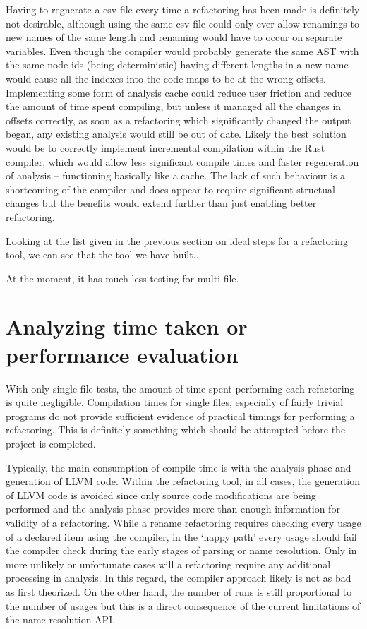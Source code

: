 Having to regnerate a csv file every time a refactoring has been made is definitely not desirable, although using the same csv file could only ever allow renamings to new names of the same length and renaming would have to occur on separate variables. Even though the compiler would probably generate the same AST with the same node ids (being deterministic) having different lengths in a new name would cause all the indexes into the code maps to be at the wrong offsets. Implementing some form of analysis cache could reduce user friction and reduce the amount of time spent compiling, but unless it managed all the changes in offsets correctly, as soon as a refactoring which significantly changed the output began, any existing analysis would still be out of date. Likely the best solution would be to correctly implement incremental compilation within the Rust compiler, which would allow less significant compile times and faster regeneration of analysis -- functioning basically like a cache. The lack of such behaviour is a shortcoming of the compiler and does appear to require significant structual changes but the benefits would extend further than just enabling better refactoring.

Looking at the list given in the previous section on ideal steps for a refactoring tool, we can see that the tool we have built... 

At the moment, it has much less testing for multi-file. 


\section{Analyzing time taken or performance evaluation}
With only single file tests, the amount of time spent performing each refactoring is quite negligible. Compilation times for single files, especially of fairly trivial programs do not provide sufficient evidence of practical timings for performing a refactoring. This is definitely something which should be attempted before the project is completed.

Typically, the main consumption of compile time is with the analysis phase and generation of LLVM code. Within the refactoring tool, in all cases, the generation of LLVM code is avoided since only source code modifications are being performed and the analysis phase provides more than enough information for validity of a refactoring. While a rename refactoring requires checking every usage of a declared item using the compiler, in the `happy path' every usage should fail the compiler check during the early stages of parsing or name resolution. Only in more unlikely or unfortunate cases will a refactoring require any additional processing in analysis. In this regard, the compiler approach likely is not as bad as first theorized. On the other hand, the number of runs is still proportional to the number of usages but this is a direct consequence of the current limitations of the name resolution API.

